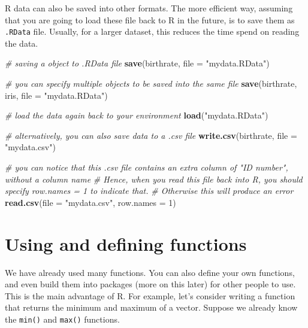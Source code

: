 \documentclass[
]{book}
\newenvironment{Shaded}{\begin{snugshade}}{\end{snugshade}}
\newcommand{\AttributeTok}[1]{\textcolor[rgb]{0.13,0.29,0.53}{#1}}
\newcommand{\CommentTok}[1]{\textcolor[rgb]{0.56,0.35,0.01}{\textit{#1}}}
\newcommand{\DecValTok}[1]{\textcolor[rgb]{0.00,0.00,0.81}{#1}}
\newcommand{\FunctionTok}[1]{\textcolor[rgb]{0.13,0.29,0.53}{\textbf{#1}}}
\newcommand{\NormalTok}[1]{#1}
\newcommand{\StringTok}[1]{\textcolor[rgb]{0.31,0.60,0.02}{#1}}
\theoremstyle{definition}
\theoremstyle{definition}
\theoremstyle{definition}
\theoremstyle{definition}
\theoremstyle{remark}
\begin{document}
R data can also be saved into other formats. The more efficient way, assuming that you are going to load these file back to R in the future, is to save them as \texttt{.RData} file. Usually, for a larger dataset, this reduces the time spend on reading the data.

\begin{Shaded}
\begin{Highlighting}[]
    \CommentTok{\# saving a object to .RData file}
    \FunctionTok{save}\NormalTok{(birthrate, }\AttributeTok{file =} \StringTok{"mydata.RData"}\NormalTok{)}
  
    \CommentTok{\# you can specify multiple objects to be saved into the same file}
    \FunctionTok{save}\NormalTok{(birthrate, iris, }\AttributeTok{file =} \StringTok{"mydata.RData"}\NormalTok{)}
    
    \CommentTok{\# load the data again back to your environment}
    \FunctionTok{load}\NormalTok{(}\StringTok{"mydata.RData"}\NormalTok{)}
    
    \CommentTok{\# alternatively, you can also save data to a .csv file}
    \FunctionTok{write.csv}\NormalTok{(birthrate, }\AttributeTok{file =} \StringTok{"mydata.csv"}\NormalTok{)}
    
    \CommentTok{\# you can notice that this .csv file contains an extra column of "ID number", without a column name}
    \CommentTok{\# Hence, when you read this file back into R, you should specify \textasciigrave{}row.names = 1\textasciigrave{} to indicate that.}
    \CommentTok{\# Otherwise this will produce an error}
    \FunctionTok{read.csv}\NormalTok{(}\AttributeTok{file =} \StringTok{"mydata.csv"}\NormalTok{, }\AttributeTok{row.names =} \DecValTok{1}\NormalTok{)}
\end{Highlighting}
\end{Shaded}

\hypertarget{using-and-defining-functions}{%
\section{Using and defining functions}\label{using-and-defining-functions}}

We have already used many functions. You can also define your own functions, and even build them into packages (more on this later) for other people to use. This is the main advantage of R. For example, let's consider writing a function that returns the minimum and maximum of a vector. Suppose we already know the \texttt{min()} and \texttt{max()} functions.
\end{document}
